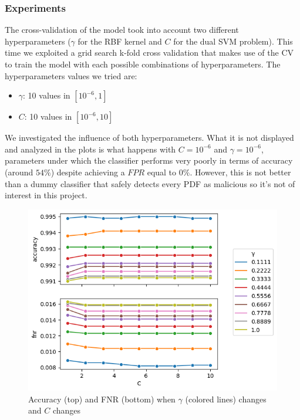 \documentclass[twocolumn, switch]{article} %
\newcommand\x{0.7}
\begin{document}
\subsubsection{Experiments}
\label{sub:expsvm}
The cross-validation of the model took into account two different hyperparameters ($\gamma$ for the RBF kernel and $C$ for the dual SVM problem).
This time we exploited a grid search k-fold cross validation that makes use of the CV to train the model with each possible combinations of hyperparameters. The hyperparameters values we tried are:
\begin{itemize}
	\item $\gamma$: 10 values in $[10^{-6}, 1]$
	\item $C$: 10 values in $[10^{-6}, 10]$
\end{itemize}
We investigated the influence of both hyperparameters. What it is not displayed and analyzed in the plots is what happens with $C=10^{-6}$ and $\gamma=10^{-6}$, parameters under which the classifier performs very poorly in terms of accuracy (around $54\%$) despite achieving a $FPR$ equal to $0\%$. However, this is not better than a dummy classifier that safely detects every PDF as malicious so it's not of interest in this project.

\begin{figure}[ht!]
	\centering
	\includegraphics[width=\x\linewidth]{rbf_svm_gamma_accuracy_fnr.png}
	\caption{Accuracy (top) and FNR (bottom) when $\gamma$ (colored lines) changes and $C$ changes}
	\label{fig:rbfsvmgamma}
\end{figure}
\end{document}
